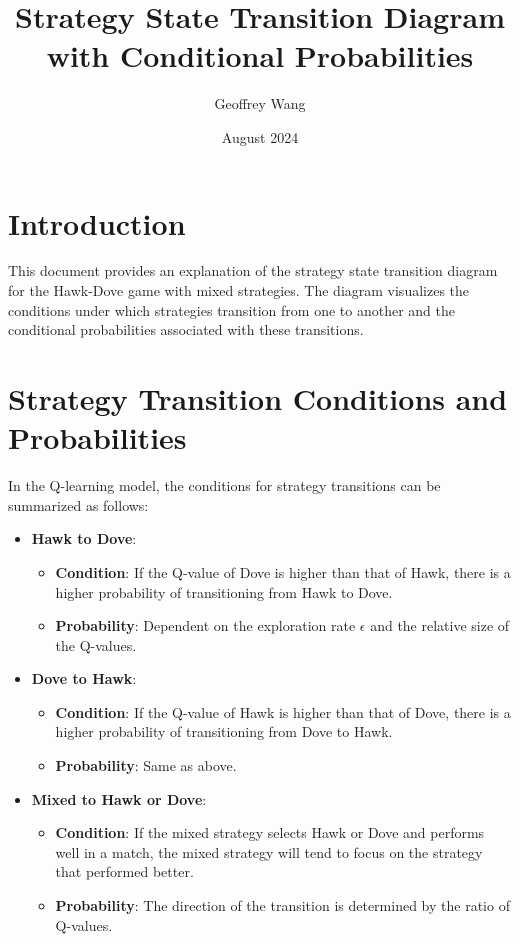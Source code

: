 \documentclass{article}
\title{Strategy State Transition Diagram with Conditional Probabilities}
\author{Geoffrey Wang}
\date{August 2024}
\begin{document}
\maketitle

\section*{Introduction}

This document provides an explanation of the strategy state transition diagram for the Hawk-Dove game with mixed strategies. The diagram visualizes the conditions under which strategies transition from one to another and the conditional probabilities associated with these transitions.

\section*{Strategy Transition Conditions and Probabilities}

In the Q-learning model, the conditions for strategy transitions can be summarized as follows:

\begin{itemize}
    \item \textbf{Hawk to Dove}:
    \begin{itemize}
        \item \textbf{Condition}: If the Q-value of Dove is higher than that of Hawk, there is a higher probability of transitioning from Hawk to Dove.
        \item \textbf{Probability}: Dependent on the exploration rate $\epsilon$ and the relative size of the Q-values.
    \end{itemize}
    
    \item \textbf{Dove to Hawk}:
    \begin{itemize}
        \item \textbf{Condition}: If the Q-value of Hawk is higher than that of Dove, there is a higher probability of transitioning from Dove to Hawk.
        \item \textbf{Probability}: Same as above.
    \end{itemize}
    
    \item \textbf{Mixed to Hawk or Dove}:
    \begin{itemize}
        \item \textbf{Condition}: If the mixed strategy selects Hawk or Dove and performs well in a match, the mixed strategy will tend to focus on the strategy that performed better.
        \item \textbf{Probability}: The direction of the transition is determined by the ratio of Q-values.
    \end{itemize}
\end{itemize}
\end{document}
